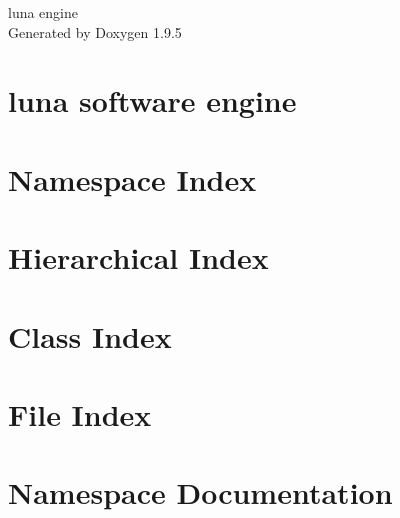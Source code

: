 \documentclass[twoside]{book}
\newcommand{\+}{\discretionary{\mbox{\scriptsize$\hookleftarrow$}}{}{}}
\newcommand{\clearemptydoublepage}{%
    \newpage{\pagestyle{empty}\cleardoublepage}%
  }
\begin{document}
  \raggedbottom
    \hypersetup{pageanchor=false,
                bookmarksnumbered=true,
                pdfencoding=unicode
               }
  \begin{titlepage}
  \vspace*{7cm}
  \begin{center}%
  {\Large luna engine}\\
  \vspace*{1cm}
  {\large Generated by Doxygen 1.9.5}\\
  \end{center}
  \end{titlepage}
  \clearemptydoublepage
  \tableofcontents
  \clearemptydoublepage
  \hypersetup{pageanchor=true}
\chapter{luna software engine}
\label{md__c___users_robbe_source_repos_lolrobbe2_luna__r_e_a_d_m_e}

\chapter{Namespace Index}

\chapter{Hierarchical Index}

\chapter{Class Index}

\chapter{File Index}

\chapter{Namespace Documentation}










\end{document}
